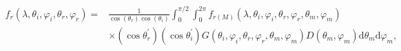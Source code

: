 

\begin{equation}
    \label{eq_brdf_microfacet}
    \begin{array}{ll}
        f_r(\lambda, \theta_i, \varphi_i, \theta_r, \varphi_r) = & \frac{1}{\cos(\theta_r) \cos(\theta_i)}            %
        \int_{0}^{\pi /2} \int_{0}^{2\pi}%
        f_{r(M)}(\lambda, \theta_i, \varphi_i, \theta_r, \varphi_r, \theta_m, \varphi_m)                              \\
                                                                 & \times (\cos\theta_r^\prime) (\cos\theta_i^\prime) %
        G(\theta_i, \varphi_i, \theta_r, \varphi_r, \theta_m, \varphi_m)%
        D(\theta_m, \varphi_m)\mathrm{d} \theta_m \mathrm{d} \varphi_m,
    \end{array}
\end{equation}

